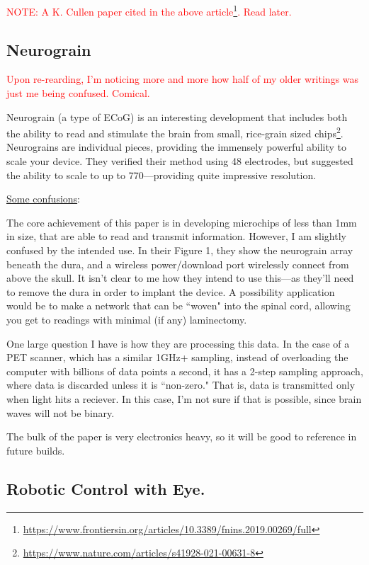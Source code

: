 \textcolor{red}{NOTE: A K. Cullen paper cited in the above article\footnote{\url{https://www.frontiersin.org/articles/10.3389/fnins.2019.00269/full}}. Read later.}

\subsection{Neurograin}

\textcolor{red}{Upon re-rearding, I'm noticing more and more how half of my older writings was just me being confused. Comical.}

Neurograin (a type of ECoG) is an interesting development that includes both the ability to read and stimulate the brain from small, rice-grain sized chips\footnote{\url{https://www.nature.com/articles/s41928-021-00631-8}}. Neurograins are individual pieces, providing the immensely powerful ability to scale your device. They verified their method using 48 electrodes, but suggested the ability to scale to up to 770---providing quite impressive resolution.\newline

\underline{Some confusions}:

The core achievement of this paper is in developing microchips of less than 1mm in size, that are able to read and transmit information. However, I am slightly confused by the intended use. In their Figure 1, they show the neurograin array beneath the dura, and a wireless power/download port wirelessly connect from above the skull. It isn't clear to me how they intend to use this---as they'll need to remove the dura in order to implant the device. A possibility application would be to make a network that can be ``woven" into the spinal cord, allowing you get to readings with minimal (if any) laminectomy. \newline

One large question I have is how they are processing this data. In the case of a PET scanner, which has a similar 1GHz+ sampling, instead of overloading the computer with billions of data points a second, it has a 2-step sampling approach, where data is discarded unless it is ``non-zero." That is, data is transmitted only when light hits a reciever. In this case, I'm not sure if that is possible, since brain waves will not be binary.\newline

The bulk of the paper is very electronics heavy, so it will be good to reference in future builds. 


\subsection{Robotic Control with Eye.}

